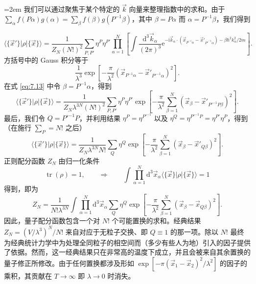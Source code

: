 {\emergencystretch=2em\relax
我们可以通过聚焦于某个特定的 $\vec k$ 向量来整理指数中的求和。由于 $\sum_\alpha f(P\alpha)g(\alpha)=\sum_\beta f(\beta)g(P^{-1}\beta)$，其中 $\beta=P\alpha$ 而 $\alpha=P^{-1}\beta$，我们得到\par}
\begin{equation}\label{eq:7.13}
\langle\{\vec x'\}|\rho|\{\vec x\}\rangle=\frac1{Z_N(N!)^2}\sum_{P,P'}\eta^P\eta^{P'}\prod_{\alpha=1}^N\left[\int\frac{\mathrm d^3\vec k_\alpha}{(2\pi)^3}\mathrm e^{-\mathrm i\vec k_\alpha\cdot(\vec x_{P^{-1}\alpha}-\vec x'_{P'^{-1}\alpha})-\beta\hbar^2k_\alpha^2/2m}\right].
\end{equation}
方括号中的 Gauss 积分等于
\begin{equation*}
\frac1{\lambda^3}\exp\left[-\frac\pi{\lambda^2}\left(\vec x_{P^{-1}\alpha}-\vec x'_{P'^{-1}\alpha}\right)^2\right].
\end{equation*}
在式 \eqref{eq:7.13} 中令 $\beta=P^{-1}\alpha$，得到
\begin{equation}\label{eq:7.14}
\langle\{\vec x'\}|\rho|\{\vec x\}\rangle=\frac1{Z_N\lambda^{3N}(N!)^2}\sum_{P,P'}\eta^P\eta^{P'}\exp\left[-\frac\pi{\lambda^2}\sum_{\beta=1}^N\left(\vec x_\beta-\vec x'_{P'^{-1}P\beta}\right)^2\right].
\end{equation}
最后，我们令 $Q=P'^{-1}P$，并利用结果 $\eta^P=\eta^{P'^{-1}}$ 以及 $\eta^Q=\eta^{P'^{-1}P}=\eta^{P'}\eta^P$，得到（在施行 $\sum_P=N!$ 之后）
\begin{equation}\label{eq:7.15}
\langle\{\vec x'\}|\rho|\{\vec x\}\rangle=\frac1{Z_N\lambda^{3N}N!}\sum_Q\eta^Q\exp\left[-\frac\pi{\lambda^2}\sum_{\beta=1}^N\left(\vec x_\beta-\vec x'_{Q\beta}\right)^2\right].
\end{equation}
正则配分函数 $Z_N$ 由归一化条件
\begin{equation*}
\operatorname{tr}(\rho)=1,\qquad\Longrightarrow\qquad\int\prod_{\alpha=1}^N\mathrm d^3\vec x_\alpha\langle\{\vec x\}|\rho|\{\vec x\}\rangle=1
\end{equation*}
得到，即为
\begin{equation}\label{eq:7.16}
Z_N=\frac1{N!\lambda^{3N}}\int\prod_{\alpha=1}^N\mathrm d^3\vec x_\alpha\sum_Q\eta^Q\exp\left[-\frac\pi{\lambda^2}\sum_{\beta=1}^N\left(\vec x_\beta-\vec x_{Q\beta}\right)^2\right].
\end{equation}
因此，量子配分函数包含一个对 $N!$ 个可能置换的求和。经典结果 $Z_N=(V/\lambda^3)^N/N!$ 来自对应于无粒子交换、即 $Q\equiv1$ 的那一项。除以 $N!$ 最终为经典统计力学中为处理全同粒子的相空间而（多少有些人为地）引入的因子提供了依据。然而，这一经典结果只在非常高的温度下成立，并且会被来自其余置换的量子修正所修改。由于任何置换都涉及形如 $\exp[-\pi(\vec x_1-\vec x_2)^2/\lambda^2]$ 的因子的乘积，其贡献在 $T\to\infty$ 即 $\lambda\to0$ 时消失。

